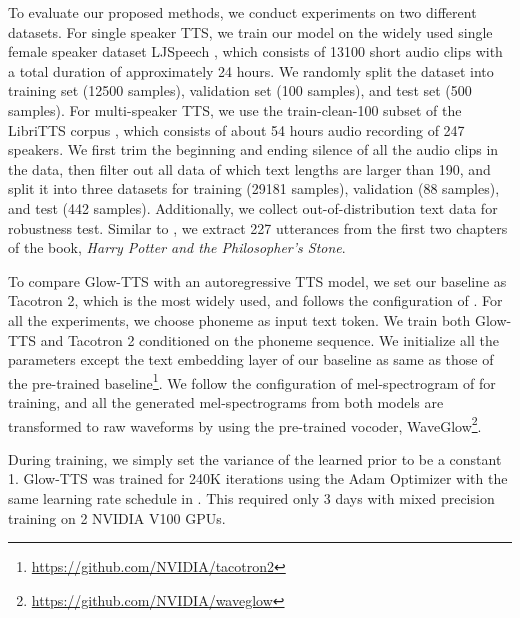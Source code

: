 \documentclass{article}
\begin{document}
To evaluate our proposed methods, we conduct experiments on two different datasets. For single speaker TTS, we train our model on the widely used single female speaker dataset LJSpeech \cite{ljspeech17}, which consists of 13100 short audio clips with a total duration of approximately 24 hours. We randomly split the dataset into training set (12500 samples), validation set (100 samples), and test set (500 samples). For multi-speaker TTS, we use the train-clean-100 subset of the LibriTTS corpus \cite{zen2019libritts}, which consists of about 54 hours audio recording of 247 speakers. We first trim the beginning and ending silence of all the audio clips in the data, then filter out all data of which text lengths are larger than 190, and split it into three datasets for training (29181 samples), validation (88 samples), and test (442 samples). Additionally, we collect out-of-distribution text data for robustness test. Similar to \cite{battenberg2019location}, we extract 227 utterances from the first two chapters of the book, \textit{Harry Potter and the Philosopher's Stone}.

To compare Glow-TTS with an autoregressive TTS model, we set our baseline as Tacotron 2, which is the most widely used, and follows the configuration of \cite{repo2018tacotron}. For all the experiments, we choose phoneme as input text token. We train both Glow-TTS and Tacotron 2 conditioned on the phoneme sequence. We initialize all the parameters except the text embedding layer of our baseline as same as those of the pre-trained baseline\footnote{\href{https://github.com/NVIDIA/tacotron2}{https://github.com/NVIDIA/tacotron2}}. We follow the configuration of mel-spectrogram of \cite{repo2019WaveGlow} for training, and all the generated mel-spectrograms from both models are transformed to raw waveforms by using the pre-trained vocoder, WaveGlow\footnote{\href{https://github.com/NVIDIA/waveglow}{https://github.com/NVIDIA/waveglow}}.
 
During training, we simply set the variance  of the learned prior to be a constant 1. Glow-TTS was trained for 240K iterations using the Adam Optimizer with the same learning rate schedule in \cite{vaswani2017attention}. This required only 3 days with mixed precision training on 2 NVIDIA V100 GPUs.
\end{document}
